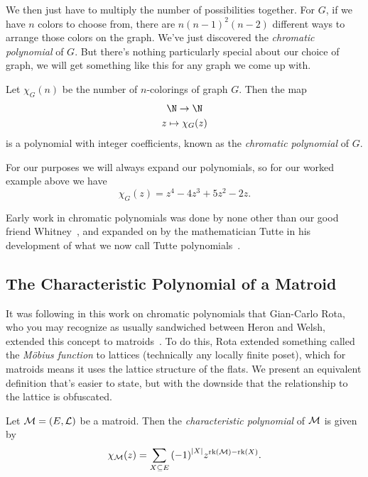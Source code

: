 \documentclass[12pt,oneside]{../../sfsuthesis}
\begin{document}
We then just have to multiply the number of possibilities together.
For \( G \), if we have \( n \) colors to choose from, there are \( n {(n-1)}^2 (n - 2) \) different ways to arrange those colors on the graph.
We've just discovered the \emph{chromatic polynomial} of \( G \).
But there's nothing particularly special about our choice of graph, we will get something like this for any graph we come up with.

\begin{definition}\th\label{def:chromaticPoly}

    Let \( \chi_G(n) \) be the number of \( n \)-colorings of graph \( G \).
    Then the map
    \begin{gather*}
        \N \to \N \\
        z \mapsto \chi_G(z)
    \end{gather*}
    is a polynomial with integer coefficients, known as the \emph{chromatic polynomial} of \( G \).

\end{definition}

For our purposes we will always expand our polynomials, so for our worked example above we have
\[
    \chi_G(z) = z^4 - 4z^3 + 5z^2 - 2z.
\]

Early work in chromatic polynomials was done by none other than our good friend Whitney~\cite{whitneyColoringGraphs1932}, and expanded on by the mathematician Tutte in his development of what we now call Tutte polynomials~\cite{tutteContributionTheoryChromatic1954}.

\subsection{The Characteristic Polynomial of a Matroid}

It was following in this work on chromatic polynomials that Gian-Carlo Rota, who you may recognize as usually sandwiched between Heron and Welsh, extended this concept to matroids~\cite{rotaFoundationsCombinatorialTheory1964}.
To do this, Rota extended something called the \emph{M\"obius function} to lattices (technically any locally finite poset), which for matroids means it uses the lattice structure of the flats.
We present an equivalent definition that's easier to state, but with the downside that the relationship to the lattice is obfuscated.

\begin{definition}\th\label{def:characteristicPoly}

    Let \( \mathcal{M} = (E, \mathcal{L}) \) be a matroid.
    Then the \emph{characteristic polynomial} of \( \mathcal{M} \) is given by
    \[
        \chi_{\mathcal{M}}(z) = \sum_{X \subseteq E} {(-1)}^{|X|}z^{\operatorname{rk}(\mathcal{M}) - \operatorname{rk}(X)}.
    \]
\end{definition}
\end{document}
